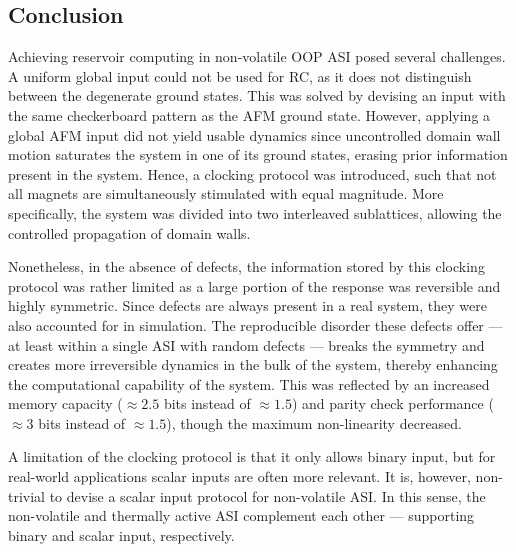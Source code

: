\subsection{Conclusion}
Achieving reservoir computing in non-volatile OOP ASI posed several challenges.
A uniform global input could not be used for RC, as it does not distinguish between the degenerate ground states.
This was solved by devising an input with the same checkerboard pattern as the AFM ground state.
However, applying a global AFM input did not yield usable dynamics since uncontrolled domain wall motion saturates the system in one of its ground states, erasing prior information present in the system.
Hence, a clocking protocol was introduced, such that not all magnets are simultaneously stimulated with equal magnitude.
More specifically, the system was divided into two interleaved sublattices, allowing the controlled propagation of domain walls. \par
Nonetheless, in the absence of defects, the information stored by this clocking protocol was rather limited as a large portion of the response was reversible and highly symmetric.
Since defects are always present in a real system, they were also accounted for in simulation.
The reproducible disorder these defects offer --- at least within a single ASI with random defects --- breaks the symmetry and creates more irreversible dynamics in the bulk of the system, thereby enhancing the computational capability of the system.
This was reflected by an increased memory capacity ($\approx 2.5$ bits instead of $\approx 1.5$) and parity check performance ($\approx 3$ bits instead of $\approx 1.5$), though the maximum non-linearity decreased. \par
A limitation of the clocking protocol is that it only allows binary input, but for real-world applications scalar inputs are often more relevant.
It is, however, non-trivial to devise a scalar input protocol for non-volatile ASI.
In this sense, the non-volatile and thermally active ASI complement each other --- supporting binary and scalar input, respectively.


